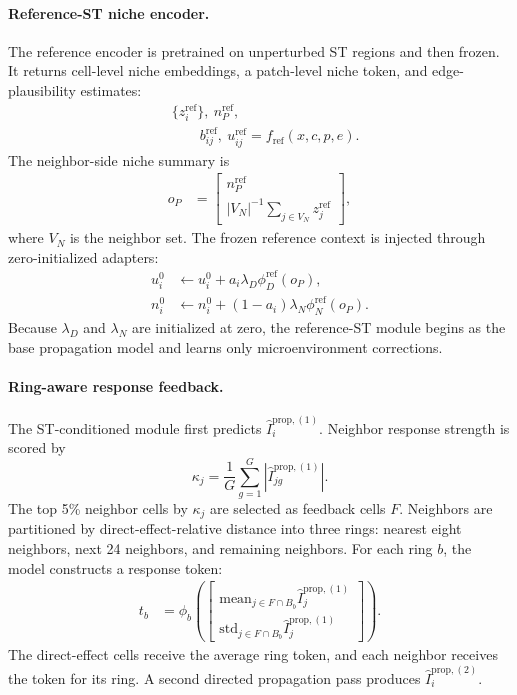 \documentclass[sigconf,review,balance=false]{acmart}
\begin{document}
\paragraph{Reference-ST niche encoder.}
The reference encoder is pretrained on unperturbed ST regions and then frozen. It returns cell-level niche embeddings, a patch-level niche token, and edge-plausibility estimates:
\[
\begin{aligned}
&\{z_i^{\mathrm{ref}}\},\ n_P^{\mathrm{ref}},\\
&\qquad b_{ij}^{\mathrm{ref}},\ u_{ij}^{\mathrm{ref}}
 = f_{\mathrm{ref}}(x,c,p,e).
\end{aligned}
\]
The neighbor-side niche summary is
\[
\begin{aligned}
o_P
&=
\begin{bmatrix}
n_P^{\mathrm{ref}}\\
|V_N|^{-1}\sum_{j\in V_N}z_j^{\mathrm{ref}}
\end{bmatrix},
\end{aligned}
\]
where $V_N$ is the neighbor set. The frozen reference context is injected through zero-initialized adapters:
\[
\begin{aligned}
u_i^0
&\leftarrow
u_i^0+a_i\lambda_D\phi_D^{\mathrm{ref}}(o_P),\\
n_i^0
&\leftarrow
n_i^0+(1-a_i)\lambda_N\phi_N^{\mathrm{ref}}(o_P).
\end{aligned}
\]
Because $\lambda_D$ and $\lambda_N$ are initialized at zero, the reference-ST module begins as the base propagation model and learns only microenvironment corrections.

\paragraph{Ring-aware response feedback.}
The ST-conditioned module first predicts $\widehat I_i^{\mathrm{prop},(1)}$. Neighbor response strength is scored by
\[
\kappa_j
=
\frac{1}{G}
\sum_{g=1}^{G}
\left|
\widehat I_{jg}^{\mathrm{prop},(1)}
\right|.
\]
The top 5\% neighbor cells by $\kappa_j$ are selected as feedback cells $F$. Neighbors are partitioned by direct-effect-relative distance into three rings: nearest eight neighbors, next 24 neighbors, and remaining neighbors. For each ring $b$, the model constructs a response token:
\[
\begin{aligned}
t_b
&=
\phi_b\!\left(
\begin{bmatrix}
\mathrm{mean}_{j\in F\cap B_b}\widehat I_j^{\mathrm{prop},(1)}\\
\mathrm{std}_{j\in F\cap B_b}\widehat I_j^{\mathrm{prop},(1)}
\end{bmatrix}
\right).
\end{aligned}
\]
The direct-effect cells receive the average ring token, and each neighbor receives the token for its ring. A second directed propagation pass produces $\widehat I_i^{\mathrm{prop},(2)}$.
\end{document}
